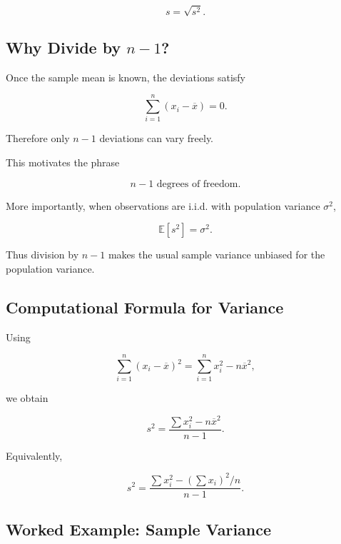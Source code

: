 \[
\boxed{
s
=
\sqrt{s^2}.
}
\]

\subsection{Why Divide by \(n-1\)?}
\label{subsec:why-n-minus-one}

Once the sample mean is known, the deviations satisfy

\[
\sum_{i=1}^{n}
(x_i-\overline{x})
=
0.
\]

Therefore only \(n-1\) deviations can vary freely.

This motivates the phrase

\[
\boxed{
n-1
\text{ degrees of freedom}.
}
\]

More importantly, when observations are i.i.d. with population variance
\(\sigma^2\),

\[
\boxed{
\mathbb{E}[s^2]
=
\sigma^2.
}
\]

Thus division by \(n-1\) makes the usual sample variance unbiased for
the population variance.

\subsection{Computational Formula for Variance}
\label{subsec:computational-variance-formula}

Using

\[
\sum_{i=1}^{n}
(x_i-\overline{x})^2
=
\sum_{i=1}^{n}x_i^2
-
n\overline{x}^2,
\]

we obtain

\[
\boxed{
s^2
=
\frac{
\sum x_i^2
-
n\overline{x}^2
}{
n-1
}.
}
\]

Equivalently,

\[
\boxed{
s^2
=
\frac{
\sum x_i^2
-
(\sum x_i)^2/n
}{
n-1
}.
}
\]

\subsection{Worked Example: Sample Variance}
\label{subsec:worked-sample-variance}

